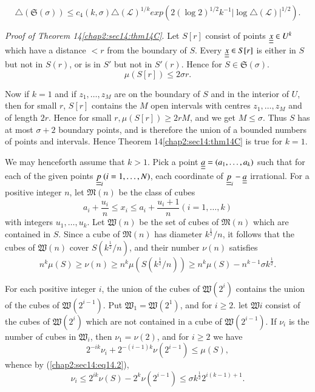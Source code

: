 \begin{theorem}\label{chap2:sec14:thm14D} 
$$
\triangle(\mathfrak{S} (\sigma)) \leq c_{4} (k, \sigma) \triangle(\mathscr{L})^{1/k} exp (2(\log 2)^{1/2} k^{-1} |\log \triangle (\mathscr{L})|^{1/2}).
$$
\end{theorem}

\medskip
\noindent \textit{Proof of Theorem 14\ref{chap2:sec14:thm14C}}. Let $S[r]$ consist of points $\underline{\underline{x}} \in U^{k}$ which have a distance $< r$ from the boundary of $S$. Every $\underline{\underline{x}} \in S[r]$ is either in $S$ but not in $S(r)$, or is in $S'$ but not in $S'(r)$. Hence for $S \in \mathfrak{S}(\sigma)$.
$$
\mu (S[r]) \leq 2 \sigma r.
$$

Now if $k = 1$ and if $z_{1}, \ldots, z_{M}$ are on the boundary of $S$ and in the interior of $U$, then for small $r$, $S[r]$ contains the $M$ open intervals with centres $z_{1}, \ldots, z_{M}$ and of length $2r$. Hence for small $r, \mu(S[r]) \geq 2r M$, and we get $M \leq \sigma$. Thus $S$ has at most $\sigma + 2$ boundary points, and is therefore the union of a bounded numbers of points and intervals. Hence Theorem 14\ref{chap2:sec14:thm14C} is true for $k = 1$.

We may henceforth assume that $k > 1$. Pick a point $\underline{\underline{a}} = (a_{1}, \ldots, a_{k})$ such that for each of the given points $\underline{\underline{p}}_{i} (i = 1, \ldots, N)$, each coordinate of $\underline{\underline{p}}_{i} - \underline{\underline{a}}$ irrational. For a positive integer $n$, let $\mathfrak{M} (n)$ be the class of cubes
$$
a_{i} + \frac{u_{i}}{n} \leq x_{i} \leq a_{i} + \frac{u_{i} + 1}{n} (i = 1, \ldots, k)
$$
with integers $u_{1}, \ldots, u_{k}$. Let $\mathfrak{W} (n)$ be the set of cubes of $\mathfrak{M} (n)$ which are contained in $S$. Since a cube of $\mathfrak{M} (n)$ has diameter $k^{\frac{1}{2}}/n$, it follows that the cubes of $\mathfrak{W} (n)$ cover $S(k^{\frac{1}{2}}/n)$, and their number $\nu(n)$ satisfies
\begin{equation*}
n^{k} \mu(S) \geq \nu(n) \geq n^{k} \mu (S(k^{\frac{1}{2}}/n)) \geq n^{k} \mu (S) - n^{k-1} \sigma k^{\frac{1}{2}}.\tag{14.2}\label{chap2:sec14:eq14.2}
\end{equation*}\pageoriginale

For each positive integer $i$, the union of the cubes of $\mathfrak{W}(2^{i})$ contains the union of the cubes of $\mathfrak{W} (2^{i-1})$. Put $\mathfrak{W}_{1}= \mathfrak{W} (2^{1})$, and for $i \geq 2$. let $\mathfrak{W} i$ consist of the cubes of $\mathfrak{W} (2^{i})$ which are not contained in a cube of $\mathfrak{W} (2^{i-1})$. If $\nu_{i}$ is the number of cubes in $\mathfrak{W}_{i}$, then $\nu_{1} = \nu(2)$, and for $i \geq 2$ we have
$$
2^{-ik} \nu_{i} + 2^{-(i - 1)k} \nu(2^{i-1}) \leq \mu(S),
$$
whence by (\ref{chap2:sec14:eq14.2}),
$$
\nu_{i} \leq 2^{ik} \nu(S) - 2^{k} \nu (2^{i-1}) \leq \sigma k^{\frac{1}{2}} 2^{i(k-1)+1}.
$$

